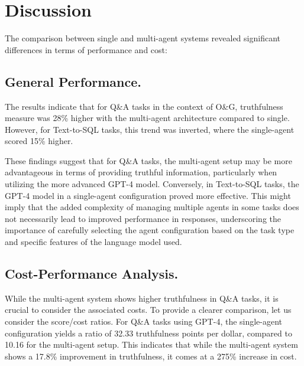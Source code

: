             

    \section{Discussion}

        The comparison between single and multi-agent systems revealed significant differences in terms of performance and cost:
        
        \subsection{General Performance.}     
            The results indicate that for Q\&A tasks in the context of O\&G, truthfulness measure was 28\% higher with the multi-agent architecture compared to single. 
            However, for Text-to-SQL tasks, this trend was inverted, where the single-agent scored 15\% higher.

            These findings suggest that for Q\&A tasks, the multi-agent setup may be more advantageous in terms of providing truthful information, particularly when utilizing the more advanced GPT-4 model. 
            Conversely, in Text-to-SQL tasks, the GPT-4 model in a single-agent configuration proved more effective. 
            This might imply that the added complexity of managing multiple agents in some tasks does not necessarily lead to improved performance in responses, underscoring the importance of carefully selecting the agent configuration based on the task type and specific features of the language model used.
                
        \subsection{Cost-Performance Analysis.}
            While the multi-agent system shows higher truthfulness in Q\&A tasks, it is crucial to consider the associated costs. 
            To provide a clearer comparison, let us consider the score/cost ratios. For Q\&A tasks using GPT-4, the single-agent configuration yields a ratio of 32.33 truthfulness points per dollar, compared to 10.16 for the multi-agent setup. This indicates that while the multi-agent system shows a 17.8\% improvement in truthfulness, it comes at a 275\% increase in cost.
            

